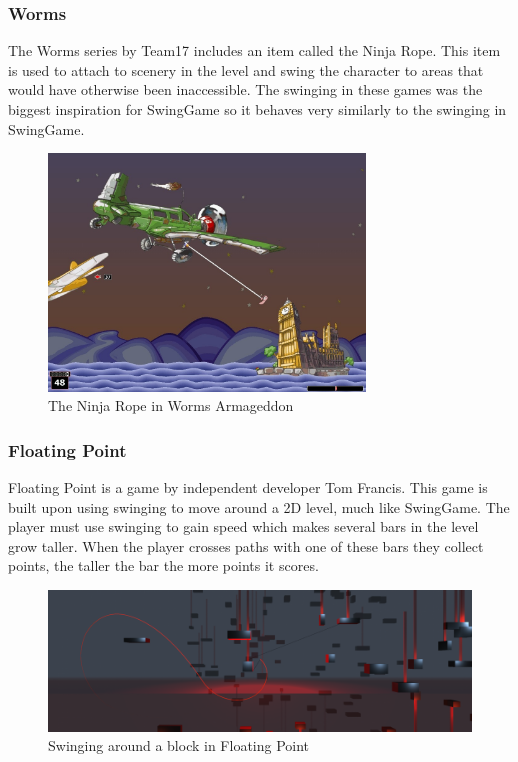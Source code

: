 \documentclass[]{report}
\begin{document}
			\subsubsection{Worms}
			The Worms \cite{worms} series by Team17 includes an item called the Ninja Rope. This item is used to attach to scenery in the level and swing the character to areas that would have otherwise been inaccessible. The swinging in these games was the biggest inspiration for SwingGame so it behaves very similarly to the swinging in SwingGame.
			\begin{figure}[H]
				\centerline{\includegraphics[width=0.75\textwidth]{worms}}
				\caption{The Ninja Rope in Worms Armageddon  \cite{wormsimage}}
				\label{wormsimage}
			\end{figure}
			\subsubsection{Floating Point}
			Floating Point \cite{floatingpoint} is a game by independent developer Tom Francis. This game is built upon using swinging to move around a 2D level, much like SwingGame. The player must use swinging to gain speed which makes several bars in the level grow taller. When the player crosses paths with one of these bars they collect points, the taller the bar the more points it scores.
			
			\begin{figure}[H]
				\centerline{\includegraphics[width=1.5\textwidth]{floatingpoint}}
				\caption{Swinging around a block in Floating Point \cite{floatingpoint}}
				\label{floatingpointimage}
			\end{figure}
\end{document}
